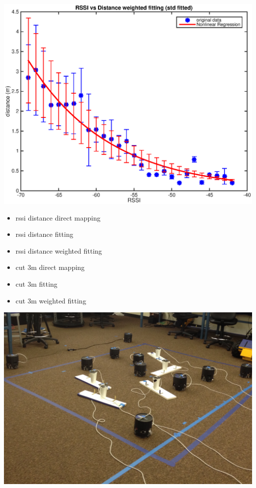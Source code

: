 \documentclass[11pt]{beamer}
\begin{document}
\begin{frame}
\includegraphics[width=\textwidth]{rssi_dis_weighted_std_fitting.eps} 
\end{frame}

\begin{frame}
\begin{itemize}
\item rssi distance direct mapping
\item rssi distance fitting
\item rssi distance weighted fitting
\item cut 3m direct mapping
\item cut 3m fitting
\item cut 3m weighted fitting
\end{itemize}
\end{frame}

\begin{frame}
\includegraphics[width=\textwidth]{wolfbot_setup.jpg} 
\end{frame}
\end{document}
